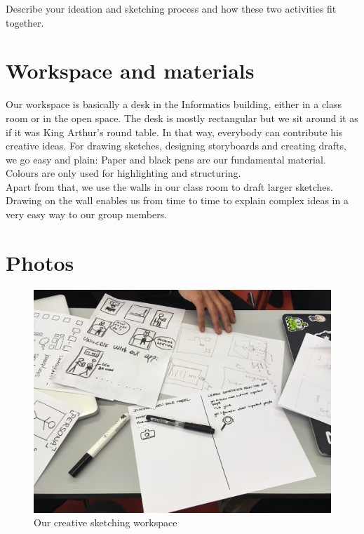 \documentclass[12pt]{scrartcl}
\begin{document}
	Describe your ideation and sketching process and how these two activities fit together.
	

\section{Workspace and materials}

	Our workspace is basically a desk in the Informatics building, either in a class room or in the open space. The desk is mostly rectangular 
	but we sit around it as if it was King Arthur's round table. In that way, everybody can contribute his creative ideas. For drawing sketches, 
	designing storyboards and creating drafts, we go easy and plain: Paper and black pens are our fundamental material. 
	Colours are only used for highlighting and structuring.\\
	
	Apart from that, we use the walls in our class room to draft larger sketches. Drawing on the wall enables us from time to time to explain 
	complex ideas in a very easy way to our group members.
	
\section{Photos}

	
	\begin{figure}[H]
        		\centering
       		\includegraphics[width=\textwidth]{../images/group1.jpg}
       		\caption{Our creative sketching workspace}
        		\label{group1}
	\end{figure}
	
\end{document}
